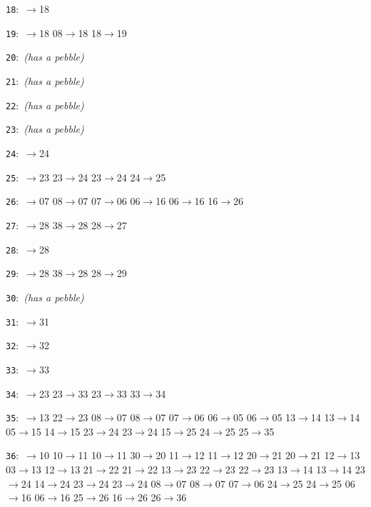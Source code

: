 \documentclass[11pt]{amsart}
\begin{document}
\begin{flushleft}
\noindent\texttt{18}:\ {\footnotesize{}$\to$18}\par
\noindent\texttt{19}:\ {\footnotesize{}$\to$18 08$\to$18 18$\to$19}\par
\noindent\texttt{20}:\ {\footnotesize\ttfamily \textrm{\itshape (has a pebble)}}\par
\noindent\texttt{21}:\ {\footnotesize\ttfamily \textrm{\itshape (has a pebble)}}\par
\noindent\texttt{22}:\ {\footnotesize\ttfamily \textrm{\itshape (has a pebble)}}\par
\noindent\texttt{23}:\ {\footnotesize\ttfamily \textrm{\itshape (has a pebble)}}\par
\noindent\texttt{24}:\ {\footnotesize{}$\to$24}\par
\noindent\texttt{25}:\ {\footnotesize{}$\to$23 23$\to$24 23$\to$24 24$\to$25}\par
\noindent\texttt{26}:\ {\footnotesize{}$\to$07 08$\to$07 07$\to$06 06$\to$16 06$\to$16 16$\to$26}\par
\noindent\texttt{27}:\ {\footnotesize{}$\to$28 38$\to$28 28$\to$27}\par
\noindent\texttt{28}:\ {\footnotesize{}$\to$28}\par
\noindent\texttt{29}:\ {\footnotesize{}$\to$28 38$\to$28 28$\to$29}\par
\noindent\texttt{30}:\ {\footnotesize\ttfamily \textrm{\itshape (has a pebble)}}\par
\noindent\texttt{31}:\ {\footnotesize{}$\to$31}\par
\noindent\texttt{32}:\ {\footnotesize{}$\to$32}\par
\noindent\texttt{33}:\ {\footnotesize{}$\to$33}\par
\noindent\texttt{34}:\ {\footnotesize{}$\to$23 23$\to$33 23$\to$33 33$\to$34}\par
\noindent\texttt{35}:\ {\footnotesize{}$\to$13 22$\to$23 08$\to$07 08$\to$07 07$\to$06 06$\to$05 06$\to$05 13$\to$14 13$\to$14 05$\to$15 14$\to$15 23$\to$24 23$\to$24 15$\to$25 24$\to$25 25$\to$35}\par
\noindent\texttt{36}:\ {\footnotesize{}$\to$10 10$\to$11 10$\to$11 30$\to$20 11$\to$12 11$\to$12 20$\to$21 20$\to$21 12$\to$13 03$\to$13 12$\to$13 21$\to$22 21$\to$22 13$\to$23 22$\to$23 22$\to$23 13$\to$14 13$\to$14 23$\to$24 14$\to$24 23$\to$24 23$\to$24 08$\to$07 08$\to$07 07$\to$06 24$\to$25 24$\to$25 06$\to$16 06$\to$16 25$\to$26 16$\to$26 26$\to$36}\par

\end{flushleft}
\end{document}
